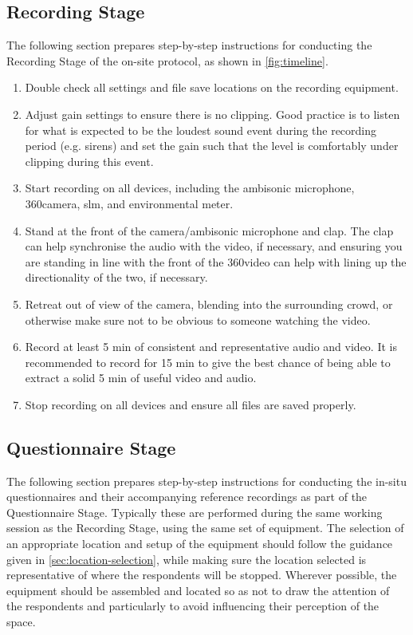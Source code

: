  \subsection{Recording Stage}

   The following section prepares step-by-step instructions for conducting the Recording Stage of the on-site protocol, as shown in \cref{fig:timeline}.

   \begin{enumerate}
     \item Double check all settings and file save locations on the recording equipment.
     \item Adjust gain settings to ensure there is no clipping. Good practice is to listen for what is expected to be the loudest sound event during the recording period (e.g. sirens) and set the gain such that the level is comfortably under clipping during this event.
     \item Start recording on all devices, including the ambisonic microphone, 360\degree camera, \gls{slm}, and environmental meter.
     \item Stand at the front of the camera/ambisonic microphone and clap. The clap can help synchronise the audio with the video, if necessary, and ensuring you are standing in line with the front of the 360\degree video can help with lining up the directionality of the two, if necessary.
     \item Retreat out of view of the camera, blending into the surrounding crowd, or otherwise make sure not to be obvious to someone watching the video.
     \item Record at least 5 min of consistent and representative audio and video. It is recommended to record for 15 min to give the best chance of being able to extract a solid 5 min of useful video and audio.
     \item Stop recording on all devices and ensure all files are saved properly.
   \end{enumerate}

 \subsection{Questionnaire Stage}

   The following section prepares step-by-step instructions for conducting the in-situ questionnaires and their accompanying reference recordings as part of the Questionnaire Stage. Typically these are performed during the same working session as the Recording Stage, using the same set of equipment. The selection of an appropriate location and setup of the equipment should follow the guidance given in \cref{sec:location-selection}, while making sure the location selected is representative of where the respondents will be stopped. Wherever possible, the equipment should be assembled and located so as not to draw the attention of the respondents and particularly to avoid influencing their perception of the space.

